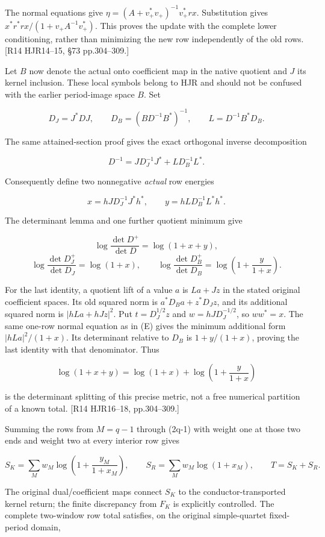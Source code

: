 The normal equations give \(\eta=(A+v_+^*v_+)^{-1}v_+^*rx\). Substitution gives \(x^*r^*r x/(1+v_+A^{-1}v_+^*)\). This proves the update with the complete lower conditioning, rather than minimizing the new row independently of the old rows. {[}R14 HJR14--15, §73 pp.304--309.{]}

Let \(B\) now denote the actual onto coefficient map in the native quotient and \(J\) its kernel inclusion. These local symbols belong to HJR and should not be confused with the earlier period-image space \(B\). Set

\[
D_J=J^*DJ,\qquad D_B=(BD^{-1}B^*)^{-1},\qquad
L=D^{-1}B^*D_B.
\]

The same attained-section proof gives the exact orthogonal inverse decomposition

\[
D^{-1}=J D_J^{-1}J^*+L D_B^{-1}L^*.
\]

Consequently define two nonnegative \emph{actual} row energies

\[
x=hJD_J^{-1}J^*h^*,\qquad
y=hLD_B^{-1}L^*h^*.
\]

The determinant lemma and one further quotient minimum give

\[
\log\frac{\det D^+}{\det D}=\log(1+x+y),
\] \[
\log\frac{\det D_J^+}{\det D_J}=\log(1+x),\qquad
\log\frac{\det D_B^+}{\det D_B}
=\log\left(1+\frac{y}{1+x}\right).
\tag{F}
\]

For the last identity, a quotient lift of a value \(a\) is \(La+Jz\) in the stated original coefficient spaces. Its old squared norm is \(a^*D_Ba+z^*D_Jz\), and its additional squared norm is \(|hLa+hJz|^2\). Put \(t=D_J^{1/2}z\) and \(w=hJD_J^{-1/2}\), so \(ww^*=x\). The same one-row normal equation as in (E) gives the minimum additional form \(|hLa|^2/(1+x)\). Its determinant relative to \(D_B\) is \(1+y/(1+x)\), proving the last identity with that denominator. Thus

\[
\log(1+x+y)=\log(1+x)+\log\left(1+\frac{y}{1+x}\right)
\]

is the determinant splitting of this precise metric, not a free numerical partition of a known total. {[}R14 HJR16--18, pp.304--309.{]}

Summing the rows from \(M=q-1\) through (2q-1) with weight one at those two ends and weight two at every interior row gives

\[
S_K=\sum_Mw_M\log\left(1+\frac{y_M}{1+x_M}\right),\qquad
S_R=\sum_Mw_M\log(1+x_M),\qquad
T=S_K+S_R.
\tag{G}
\]

The original dual/coefficient maps connect \(S_K\) to the conductor-transported kernel return; the finite discrepancy from \(F_K\) is explicitly controlled. The complete two-window row total satisfies, on the original simple-quartet fixed-period domain,

